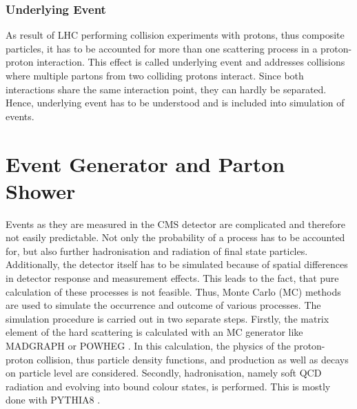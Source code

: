 \subsubsection{Underlying Event}
	As result of LHC performing collision experiments with protons, thus composite particles, it has to be accounted for more than one scattering process in a proton-proton interaction. This effect is called underlying event and addresses collisions where multiple partons from two colliding protons interact. Since both interactions share the same interaction point, they can hardly be separated. Hence, underlying event has to be understood and is included into simulation of events.
	
\section{Event Generator and Parton Shower}
\label{sec:Simulation}
	Events as they are measured in the CMS detector are complicated and therefore not easily predictable. Not only the probability of a process has to be accounted for, but also further hadronisation and radiation of final state particles. Additionally, the detector itself has to be simulated because of spatial differences in detector response and measurement effects. This leads to the fact, that pure calculation of these processes is not feasible. Thus, Monte Carlo (MC) methods are used to simulate the occurrence and outcome of various processes. The simulation procedure is carried out in two separate steps. Firstly, the matrix element of the hard scattering is calculated with an MC generator like MADGRAPH \cite{madgraph} or POWHEG \cite{powheg}. In this calculation, the physics of the proton-proton collision, thus particle density functions, and production as well as decays on particle level are considered. Secondly, hadronisation, namely soft QCD radiation and evolving into bound colour states, is performed. This is mostly done with PYTHIA8 \cite{pythia8}.

